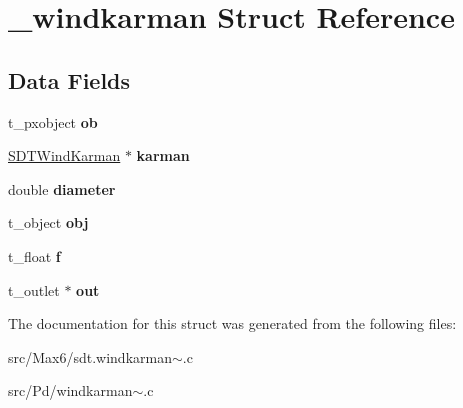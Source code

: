 \hypertarget{struct__windkarman}{}\section{\+\_\+windkarman Struct Reference}
\label{struct__windkarman}
\subsection*{Data Fields}
\begin{DoxyCompactItemize}
\item 
\hypertarget{struct__windkarman_a55b4380edb216f04a1c42b9095594963}{}t\+\_\+pxobject {\bfseries ob}\label{struct__windkarman_a55b4380edb216f04a1c42b9095594963}

\item 
\hypertarget{struct__windkarman_a45484264cbec512db7f951dd27f32458}{}\hyperlink{struct_s_d_t_wind_karman}{S\+D\+T\+Wind\+Karman} $\ast$ {\bfseries karman}\label{struct__windkarman_a45484264cbec512db7f951dd27f32458}

\item 
\hypertarget{struct__windkarman_a2242a375bebbd1a1d1cf02a80d2715a2}{}double {\bfseries diameter}\label{struct__windkarman_a2242a375bebbd1a1d1cf02a80d2715a2}

\item 
\hypertarget{struct__windkarman_a21775ab6bc98b0961a6e9fd9d832e65b}{}t\+\_\+object {\bfseries obj}\label{struct__windkarman_a21775ab6bc98b0961a6e9fd9d832e65b}

\item 
\hypertarget{struct__windkarman_a73198eb29c82f0df575e45396b68c18c}{}t\+\_\+float {\bfseries f}\label{struct__windkarman_a73198eb29c82f0df575e45396b68c18c}

\item 
\hypertarget{struct__windkarman_a07b901a5d7d4140b7f701a94bf7f245c}{}t\+\_\+outlet $\ast$ {\bfseries out}\label{struct__windkarman_a07b901a5d7d4140b7f701a94bf7f245c}

\end{DoxyCompactItemize}


The documentation for this struct was generated from the following files\+:\begin{DoxyCompactItemize}
\item 
src/\+Max6/sdt.\+windkarman$\sim$.\+c\item 
src/\+Pd/windkarman$\sim$.\+c\end{DoxyCompactItemize}
